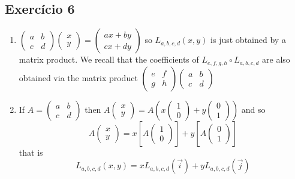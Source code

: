 \subsection*{Exercício 6}
\begin{enumerate}
\item $\begin{pmatrix}
  a & b \\
  c & d
\end{pmatrix} \begin{pmatrix}
  x \\
  y
\end{pmatrix} =
\begin{pmatrix}
  a x + by \\
  c x + d y
\end{pmatrix}$ so $L_{a,b,c,d}(x,y)$ is just obtained by a matrix product.
We recall that the coefficients of
${L_{e,f,g,h}} \circ {L_{a,b,c,d}}$ are also obtained via
the matrix product $\begin{pmatrix}
  e & f \\
  g & h
\end{pmatrix} \begin{pmatrix}
  a & b \\
  c & d
\end{pmatrix}$

\item If $A = \begin{pmatrix}
  a & b \\
  c & d
\end{pmatrix}$ then
  $ A \begin{pmatrix}
  x \\
  y
\end{pmatrix} =
  A \left( x \begin{pmatrix}
  1 \\
  0
\end{pmatrix} + y \begin{pmatrix}
  0 \\
  1
  \end{pmatrix} \right)$ and so
  $$  A \begin{pmatrix}
  x \\
  y
\end{pmatrix} = x \left[A\begin{pmatrix}
  1 \\
  0
\end{pmatrix}\right] + y \left[A\begin{pmatrix}
  0 \\
  1
    \end{pmatrix}\right]$$
  that is
  $$L_{a,b,c,d}(x,y) = x {L_{a,b,c,d}(\vec{i})} + y {L_{a,b,c,d}(\vec{j})}$$


\end{enumerate}
